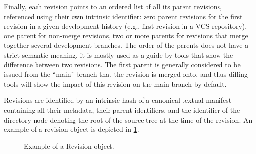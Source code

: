 Finally, each revision points to an ordered list of all its parent revisions,
referenced using their own intrinsic identifier: zero parent revisions for the
first revision in a given development history (e.g., first revision in a VCS
repository), one parent for non-merge revisions, two or more parents for
revisions that merge together several development branches.
%
The order of the parents does not have a strict semantic meaning, it is mostly
used as a guide by tools that show the difference between two revisions. The
first parent is generally considered to be issued from the ``main'' branch that
the revision is merged onto, and thus diffing tools will show the impact of
this revision on the main branch by default.

Revisions are identified by an intrinsic hash of a canonical textual
manifest containing all their metadata, their parent identifiers, and the
identifier of the directory node denoting the root of the source tree at the
time of the revision.
An example of a revision object is depicted in \cref{fig:revision-example}.

\begin{figure}[ht]
    \centering
\caption{Example of a Revision object.}%
\label{fig:revision-example}
\end{figure}


\begin{figure}\centering
{}
\end{figure}
